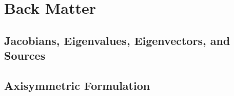 \section{Back Matter}

\subsection{Jacobians, Eigenvalues, Eigenvectors, and Sources}

\subsection{Axisymmetric Formulation}